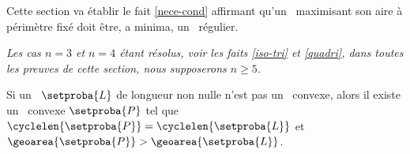 Cette section va établir le fait \ref{nece-cond} affirmant qu'un \ngone\ maximisant son aire à périmètre fixé doit être, a minima, un \ngone\ régulier.


\begin{tcolorbox}
	\itshape\small
	Les cas $n = 3$ et $n = 4$ étant résolus, voir les faits \ref{iso-tri} et \ref{quadri}, dans toutes les preuves de cette section, nous supposerons $n \geq 5 $.
\end{tcolorbox}




\begin{fact} \label{max-is-conv}
    Si un \ncycle\ $\setproba{L}$ de longueur non nulle n'est pas un \ngone\ convexe, alors il existe un \ngone\ convexe $\setproba{P}$ tel que
	$\cyclelen{\setproba{P}} = \cyclelen{\setproba{L}}$
	et
	$\geoarea{\setproba{P}} > \geoarea{\setproba{L}}$.
\end{fact}


